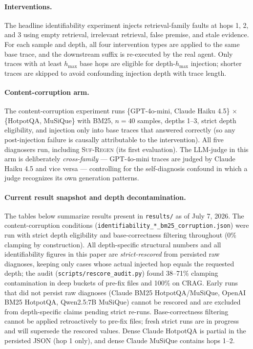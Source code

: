 \documentclass[11pt]{article}
\newcommand{\sr}{\textnormal{\textsc{Suf-Regen}}}
\begin{document}
\paragraph{Interventions.}
The headline identifiability experiment injects retrieval-family faults at hops
1, 2, and 3 using empty retrieval, irrelevant retrieval, false premise, and
stale evidence.  For each sample and depth, all four intervention types are
applied to the same base trace, and the downstream suffix is re-executed by the
real agent.  Only traces with at least $h_{\max}$ base hops are eligible for
depth-$h_{\max}$ injection; shorter traces are skipped to avoid confounding
injection depth with trace length.

\paragraph{Content-corruption arm.}
The content-corruption experiment runs \{GPT-4o-mini, Claude Haiku 4.5\}
$\times$ \{HotpotQA, MuSiQue\} with BM25, $n{=}40$ samples, depths 1--3, strict
depth eligibility, and injection only into base traces that answered correctly
(so any post-injection failure is causally attributable to the intervention).
All five diagnosers run, including \sr{} (its first evaluation).  The
LLM-judge in this arm is deliberately \emph{cross-family} --- GPT-4o-mini
traces are judged by Claude Haiku 4.5 and vice versa --- controlling for the
self-diagnosis confound in which a judge recognizes its own generation
patterns.

\paragraph{Current result snapshot and depth decontamination.}
The tables below summarize results present in \texttt{results/} as of July 7,
2026.  The content-corruption conditions
(\texttt{identifiability\_*\_bm25\_corruption.json}) were run with strict depth
eligibility and base-correctness filtering throughout (0\% clamping by
construction).  All depth-specific structural numbers and all identifiability
figures in this paper are \emph{strict-rescored} from persisted raw diagnoses,
keeping only cases whose actual injected hop equals the requested depth; the
audit (\texttt{scripts/rescore\_audit.py}) found 38--71\% clamping
contamination in deep buckets of pre-fix files and 100\% on CRAG.  Early runs
that did not persist raw diagnoses (Claude BM25 HotpotQA/MuSiQue, OpenAI BM25
HotpotQA, Qwen2.5:7B MuSiQue) cannot be rescored and are excluded from
depth-specific claims pending strict re-runs.  Base-correctness filtering
cannot be applied retroactively to pre-fix files; fresh strict runs are in
progress and will supersede the rescored values.  Dense Claude HotpotQA is
partial in the persisted JSON (hop 1 only), and dense Claude MuSiQue contains
hops 1--2.
\end{document}
